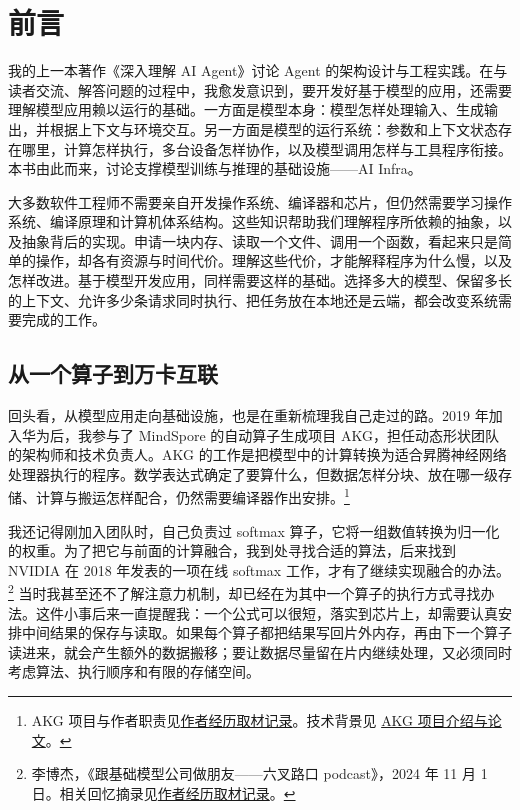 \chapter*{前言}\label{ux524dux8a00}

我的上一本著作《深入理解 AI Agent》讨论 Agent
的架构设计与工程实践。在与读者交流、解答问题的过程中，我愈发意识到，要开发好基于模型的应用，还需要理解模型应用赖以运行的基础。一方面是模型本身：模型怎样处理输入、生成输出，并根据上下文与环境交互。另一方面是模型的运行系统：参数和上下文状态存在哪里，计算怎样执行，多台设备怎样协作，以及模型调用怎样与工具程序衔接。本书由此而来，讨论支撑模型训练与推理的基础设施------AI
Infra。

大多数软件工程师不需要亲自开发操作系统、编译器和芯片，但仍然需要学习操作系统、编译原理和计算机体系结构。这些知识帮助我们理解程序所依赖的抽象，以及抽象背后的实现。申请一块内存、读取一个文件、调用一个函数，看起来只是简单的操作，却各有资源与时间代价。理解这些代价，才能解释程序为什么慢，以及怎样改进。基于模型开发应用，同样需要这样的基础。选择多大的模型、保留多长的上下文、允许多少条请求同时执行、把任务放在本地还是云端，都会改变系统需要完成的工作。

\section*{从一个算子到万卡互联}\label{ux4eceux4e00ux4e2aux7b97ux5b50ux5230ux4e07ux5361ux4e92ux8054}

回头看，从模型应用走向基础设施，也是在重新梳理我自己走过的路。2019
年加入华为后，我参与了 MindSpore 的自动算子生成项目
AKG，担任动态形状团队的架构师和技术负责人。AKG
的工作是把模型中的计算转换为适合昇腾神经网络处理器执行的程序。数学表达式确定了要算什么，但数据怎样分块、放在哪一级存储、计算与搬运怎样配合，仍然需要编译器作出安排。\footnote{AKG
  项目与作者职责见\href{../references/editorial-context/2026-09-10/preface-author-stories.md}{作者经历取材记录}。技术背景见
  \href{https://ring0.me/projects/AKG/}{AKG 项目介绍与论文}。}

我还记得刚加入团队时，自己负责过 softmax
算子，它将一组数值转换为归一化的权重。为了把它与前面的计算融合，我到处寻找合适的算法，后来找到
NVIDIA 在 2018 年发表的一项在线 softmax
工作，才有了继续实现融合的办法。\footnote{李博杰，《跟基础模型公司做朋友------六叉路口
  podcast》，2024 年 11 月 1
  日。相关回忆摘录见\href{../references/editorial-context/2026-09-10/preface-author-stories.md}{作者经历取材记录}。}
当时我甚至还不了解注意力机制，却已经在为其中一个算子的执行方式寻找办法。这件小事后来一直提醒我：一个公式可以很短，落实到芯片上，却需要认真安排中间结果的保存与读取。如果每个算子都把结果写回片外内存，再由下一个算子读进来，就会产生额外的数据搬移；要让数据尽量留在片内继续处理，又必须同时考虑算法、执行顺序和有限的存储空间。

